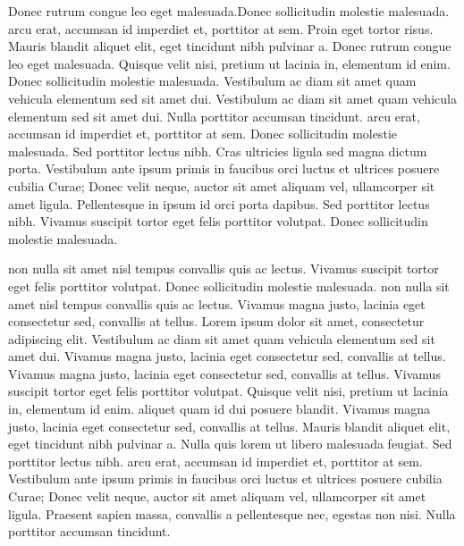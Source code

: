 \documentclass{article}
\begin{document}
Donec rutrum congue leo eget malesuada.Donec sollicitudin molestie malesuada.  arcu erat, accumsan id imperdiet et, porttitor at sem. Proin eget tortor risus. Mauris blandit aliquet elit, eget tincidunt nibh pulvinar a. Donec rutrum congue leo eget malesuada. Quisque velit nisi, pretium ut lacinia in, elementum id enim. Donec sollicitudin molestie malesuada. Vestibulum ac diam sit amet quam vehicula elementum sed sit amet dui. Vestibulum ac diam sit amet quam vehicula elementum sed sit amet dui. Nulla porttitor accumsan tincidunt.  arcu erat, accumsan id imperdiet et, porttitor at sem. Donec sollicitudin molestie malesuada. Sed porttitor lectus nibh. Cras ultricies ligula sed magna dictum porta. Vestibulum ante ipsum primis in faucibus orci luctus et ultrices posuere cubilia Curae; Donec velit neque, auctor sit amet aliquam vel, ullamcorper sit amet ligula. Pellentesque in ipsum id orci porta dapibus. Sed porttitor lectus nibh. Vivamus suscipit tortor eget felis porttitor volutpat. Donec sollicitudin molestie malesuada.


 non nulla sit amet nisl tempus convallis quis ac lectus. Vivamus suscipit tortor eget felis porttitor volutpat. Donec sollicitudin molestie malesuada.  non nulla sit amet nisl tempus convallis quis ac lectus. Vivamus magna justo, lacinia eget consectetur sed, convallis at tellus. Lorem ipsum dolor sit amet, consectetur adipiscing elit. Vestibulum ac diam sit amet quam vehicula elementum sed sit amet dui. Vivamus magna justo, lacinia eget consectetur sed, convallis at tellus. Vivamus magna justo, lacinia eget consectetur sed, convallis at tellus. Vivamus suscipit tortor eget felis porttitor volutpat. Quisque velit nisi, pretium ut lacinia in, elementum id enim.  aliquet quam id dui posuere blandit. Vivamus magna justo, lacinia eget consectetur sed, convallis at tellus. Mauris blandit aliquet elit, eget tincidunt nibh pulvinar a. Nulla quis lorem ut libero malesuada feugiat. Sed porttitor lectus nibh.  arcu erat, accumsan id imperdiet et, porttitor at sem. Vestibulum ante ipsum primis in faucibus orci luctus et ultrices posuere cubilia Curae; Donec velit neque, auctor sit amet aliquam vel, ullamcorper sit amet ligula. Praesent sapien massa, convallis a pellentesque nec, egestas non nisi. Nulla porttitor accumsan tincidunt.
\end{document}
